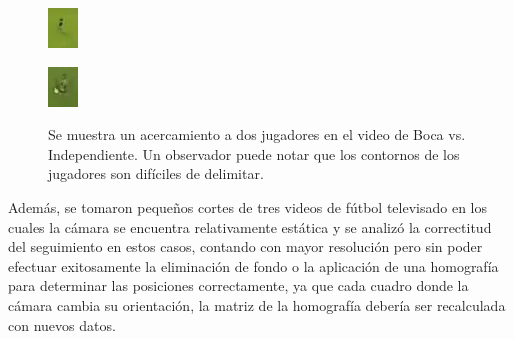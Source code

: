 \begin{figure}[H]
    \centering
    \begin{minipage}[t]{.5\textwidth}
        \centering
        \includegraphics[width=.4\linewidth]{./images/boca-dificil1.png}
        \label{fig:boca-dificil1}
    \end{minipage}%
    \begin{minipage}[t]{.5\textwidth}
        \centering
        \includegraphics[width=.4\linewidth]{./images/boca-dificil2.png}
        \label{fig:boca-difícil2}
    \end{minipage}
    \caption{Se muestra un acercamiento a dos jugadores en el video de Boca vs.
             Independiente. Un observador puede notar que los contornos de los
         jugadores son difíciles de delimitar.}

\end{figure}

Además, se tomaron pequeños cortes de tres videos de fútbol televisado en los
cuales la cámara se encuentra relativamente estática y se analizó la
correctitud del seguimiento en estos casos, contando con mayor resolución pero
sin poder efectuar exitosamente la eliminación de fondo o la aplicación de una
homografía para determinar las posiciones correctamente, ya que cada cuadro
donde la cámara cambia su orientación, la matriz de la homografía debería ser
recalculada con nuevos datos.


